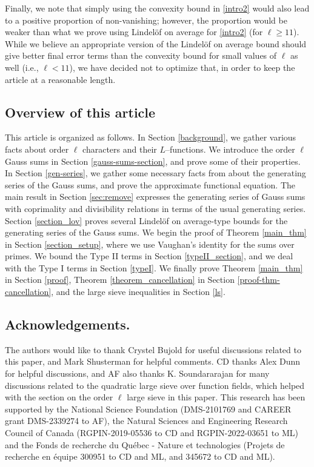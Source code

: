 \documentclass[12pt]{amsart}
\begin{document}
Finally, we note that simply using the convexity bound in \eqref{intro2} would also lead to a positive proportion of non-vanishing; however, the proportion would be weaker than what we prove using Lindel\"{o}f on average for \eqref{intro2} (for $\ell\geq 11$). While we believe an appropriate version of the Lindel\"{o}f on average bound should give better final error terms than the convexity bound for small values of $\ell$ as well (i.e., $\ell <11$), we have decided not to optimize that, in order to keep the article at a reasonable length. 



  

\subsection{Overview of this article}
This article is organized as follows. In Section \ref{background}, we gather various facts about order $\ell$ characters and their $L$--functions. We introduce the order $\ell$ Gauss sums in Section \ref{gauss-sums-section}, and prove some of their properties. In Section \ref{gen-series}, we gather some necessary facts from \cite{DFL, hoffstein, patterson} about the generating series of the Gauss sums, and prove the approximate functional equation. The main result in Section \ref{sec:remove} expresses the generating series of Gauss sums with coprimality and divisibility relations in terms of the usual generating series. Section \ref{section_lov} proves several Lindel\"{o}f on average-type bounds for the generating series of the Gauss sums. We begin the proof of Theorem \ref{main_thm} in Section \ref{section_setup}, where we use Vaughan's identity for the sums over primes. We bound the Type II terms  in Section \ref{typeII_section}, and we deal with the Type I terms in Section \ref{typeI}. We finally prove Theorem \ref{main_thm} in Section \ref{proof}, Theorem \ref{theorem_cancellation}
 in Section \ref{proof-thm-cancellation}, and  the large sieve inequalities in Section \ref{ls}.



\subsection*{Acknowledgements.}
The authors would like to thank Crystel Bujold for useful discussions related to this paper, and Mark Shusterman for helpful comments. CD thanks Alex Dunn for helpful discussions, and AF also thanks K.  Soundararajan for many discussions related to the quadratic large sieve over function fields, which helped with the section on the order $\ell$ large sieve in this paper.
This research has been supported by the National Science Foundation (DMS-2101769 and CAREER grant DMS-2339274 to AF), the Natural Sciences and Engineering Research Council of Canada (RGPIN-2019-05536 to CD and  RGPIN-2022-03651 to ML) and the Fonds de recherche du Qu\'ebec - Nature et technologies (Projets de recherche en \'equipe 300951 to CD and ML, and 345672 to CD and ML).
\end{document}
